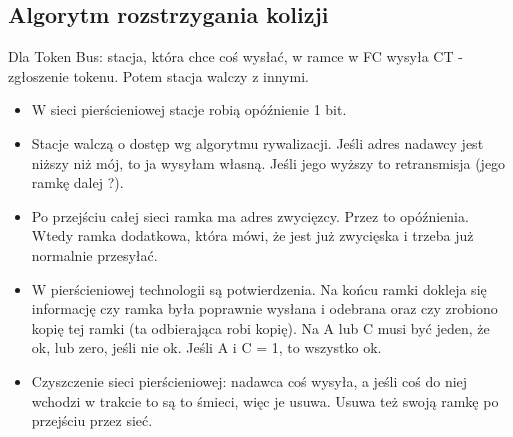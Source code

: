\documentclass[a4paper,twoside]{article}
\begin{document}
		\subsection{Algorytm rozstrzygania kolizji}
			Dla Token Bus: stacja, która chce coś wysłać, w ramce w FC wysyła CT - zgłoszenie tokenu. Potem stacja walczy z innymi.
			\begin{itemize}
				\item W sieci pierścieniowej stacje robią opóźnienie 1 bit.
				\item Stacje walczą o dostęp wg algorytmu rywalizacji. Jeśli adres nadawcy jest niższy niż mój, to ja wysyłam własną. Jeśli jego wyższy to retransmisja (jego ramkę dalej ?).
				\item Po przejściu całej sieci ramka ma adres zwycięzcy. Przez to opóźnienia. Wtedy ramka dodatkowa, która mówi, że jest już zwycięska i trzeba już normalnie przesyłać.
				\item W pierścieniowej technologii są potwierdzenia. Na końcu ramki dokleja się informację czy ramka była poprawnie wysłana i odebrana oraz czy zrobiono kopię tej ramki (ta odbierająca robi kopię). Na A lub C musi być jeden, że ok, lub zero, jeśli nie ok. Jeśli A i C = 1, to wszystko ok.
				\item Czyszczenie sieci pierścieniowej: nadawca coś wysyła, a jeśli coś do niej wchodzi w trakcie to są to śmieci, więc je usuwa. Usuwa też swoją ramkę po przejściu przez sieć.
			\end{itemize}
\end{document}
